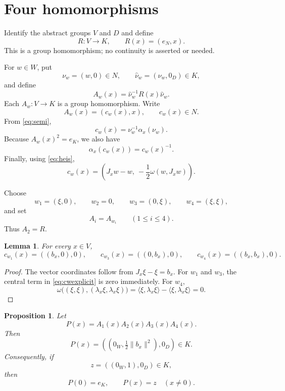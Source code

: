 \documentclass[11pt]{article}
\newtheorem{lemma}[theorem]{Lemma}
\newtheorem{proposition}[theorem]{Proposition}
\theoremstyle{remark}
\begin{document}
\section{Four homomorphisms}

Identify the abstract groups $V$ and $D$ and define
\[
R:V\longrightarrow K,
\qquad
R(x)=(e_N,x).
\]
This is a group homomorphism; no continuity is asserted or needed.

For $w\in W$, put
\[
\nu_w=(w,0)\in N,
\qquad
\widehat\nu_w=(\nu_w,0_D)\in K,
\]
and define
\begin{equation}\label{eq:Aw}
A_w(x)=\widehat\nu_w^{-1}R(x)\widehat\nu_w.
\end{equation}
Each $A_w:V\to K$ is a group homomorphism. Write
\[
A_w(x)=(c_w(x),x),
\qquad c_w(x)\in N.
\]
From \eqref{eq:semi},
\begin{equation}\label{eq:cw}
c_w(x)=\nu_w^{-1}\alpha_x(\nu_w).
\end{equation}
Because $A_w(x)^2=e_K$, we also have
\begin{equation}\label{eq:alphac}
\alpha_x(c_w(x))=c_w(x)^{-1}.
\end{equation}
Finally, using \eqref{eq:heis},
\begin{equation}\label{eq:cwexplicit}
c_w(x)
=
\left(J_xw-w,\ -\frac12\omega(w,J_xw)\right).
\end{equation}

Choose
\[
w_1=(\xi,0),
\qquad
w_2=0,
\qquad
w_3=(0,\xi),
\qquad
w_4=(\xi,\xi),
\]
and set
\[
A_i=A_{w_i}\qquad(1\le i\le4).
\]
Thus $A_2=R$.

\begin{lemma}\label{lem:cvalues}
For every $x\in V$,
\[
c_{w_1}(x)=((b_x,0),0),
\qquad
c_{w_3}(x)=((0,b_x),0),
\qquad
c_{w_4}(x)=((b_x,b_x),0).
\]
\end{lemma}

\begin{proof}
The vector coordinates follow from $J_x\xi-\xi=b_x$. For $w_1$ and $w_3$, the central term in \eqref{eq:cwexplicit} is zero immediately. For $w_4$,
\[
\omega\bigl((\xi,\xi),(\lambda_x\xi,\lambda_x\xi)\bigr)
=
\langle\xi,\lambda_x\xi\rangle-
\langle\xi,\lambda_x\xi\rangle
=0.
\]
\end{proof}

\begin{proposition}\label{prop:product}
Let
\[
P(x)=A_1(x)A_2(x)A_3(x)A_4(x).
\]
Then
\begin{equation}\label{eq:P}
P(x)=\left((0_W,\tfrac12\|b_x\|^2),0_D\right)\in K.
\end{equation}
Consequently, if
\[
z=\left((0_W,1),0_D\right)\in K,
\]
then
\begin{equation}\label{eq:twovalues}
P(0)=e_K,
\qquad
P(x)=z\quad(x\ne0).
\end{equation}
\end{proposition}
\end{document}
